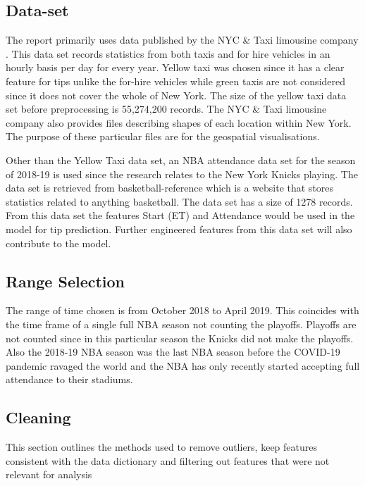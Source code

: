 \documentclass[11pt]{article}
\begin{document}
\subsection{Data-set}
The report primarily uses data published by the NYC \& Taxi limousine company \cite{taxidataset}. This data set records statistics from both taxis and for hire vehicles in an hourly basis per day for every year. Yellow taxi was chosen since it has a clear feature for tips unlike the for-hire vehicles while green taxis are not considered since it does not cover the whole of New York. The size of the yellow taxi data set before preprocessing is 55,274,200 records. The NYC \& Taxi limousine company also provides files describing shapes of each location within New York. The purpose of these particular files are for the geospatial visualisations. 

Other than the Yellow Taxi data set, an NBA attendance data set for the season of 2018-19 \cite{nbaAttendancedataset} is used since the research relates to the New York Knicks playing. The data set is retrieved from basketball-reference which is a website that stores statistics related to anything basketball. The data set has a size of 1278 records. From this data set the features Start (ET) and Attendance would be used in the model for tip prediction. Further engineered features from this data set will also contribute to the model. 

\subsection{Range Selection}
The range of time chosen is from October 2018 to April 2019. This coincides with the time frame of a single full NBA season not counting the playoffs. Playoffs are not counted since in this particular season the Knicks did not make the playoffs. Also the 2018-19 NBA season was the last NBA season before the COVID-19 pandemic ravaged the world and the NBA has only recently started accepting full attendance to their stadiums. 

\subsection{Cleaning}
This section outlines the methods used to remove outliers, keep features consistent with the data dictionary and filtering out features that were not relevant for analysis
\end{document}
